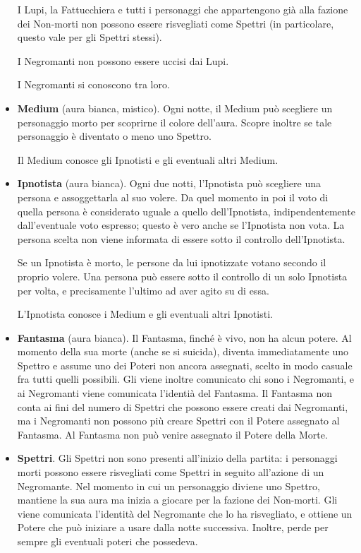 \documentclass[a4paper,10pt]{article}
\begin{document}
\begin{itemize}
 I Lupi, la Fattucchiera e tutti i personaggi che appartengono già alla fazione dei Non-morti non possono essere risvegliati come Spettri (in particolare, questo vale per gli Spettri stessi).%
 
 
 I Negromanti non possono essere uccisi dai Lupi.

 I Negromanti si conoscono tra loro.
 
 \item {\bf Medium} (aura bianca, mistico). Ogni notte, il Medium può scegliere un personaggio morto per scoprirne il colore dell'aura. Scopre inoltre se tale personaggio è diventato o meno uno Spettro.

 Il Medium conosce gli Ipnotisti e gli eventuali altri Medium.

 \item {\bf Ipnotista} (aura bianca). Ogni due notti, l'Ipnotista può scegliere una persona e assoggettarla al suo volere. Da quel momento in poi il voto di quella persona è considerato uguale a quello dell'Ipnotista, indipendentemente dall'eventuale voto espresso; questo è vero anche se l'Ipnotista non vota.
 La persona scelta non viene informata di essere sotto il controllo dell'Ipnotista.

 Se un Ipnotista è morto, le persone da lui ipnotizzate votano secondo il proprio volere.
 Una persona può essere sotto il controllo di un solo Ipnotista per volta, e precisamente l'ultimo ad aver agito su di essa.

 L'Ipnotista conosce i Medium e gli eventuali altri Ipnotisti.

 \item {\bf Fantasma} (aura bianca). Il Fantasma, finché è vivo, non ha alcun potere. Al momento della sua morte (anche se si suicida), diventa immediatamente uno Spettro e assume uno dei Poteri non ancora assegnati, scelto in modo casuale fra tutti quelli possibili. Gli viene inoltre comunicato chi sono i Negromanti, e ai Negromanti viene comunicata l'identià del Fantasma. Il Fantasma non conta ai fini del numero di Spettri che possono essere creati dai Negromanti, ma i Negromanti non possono più creare Spettri con il Potere assegnato al Fantasma.
 Al Fantasma non può venire assegnato il Potere della Morte.
 
 \item {\bf Spettri}. Gli Spettri non sono presenti all'inizio della partita: i personaggi morti possono essere risvegliati come Spettri in seguito all'azione di un Negromante.
 Nel momento in cui un personaggio diviene uno Spettro, mantiene la sua aura ma inizia a giocare per la fazione dei Non-morti. Gli viene comunicata l'identità del Negromante che lo ha risvegliato, e ottiene un Potere che può iniziare a usare dalla notte successiva. Inoltre, perde per sempre gli eventuali poteri che possedeva.
 

\end{itemize}
\end{document}
